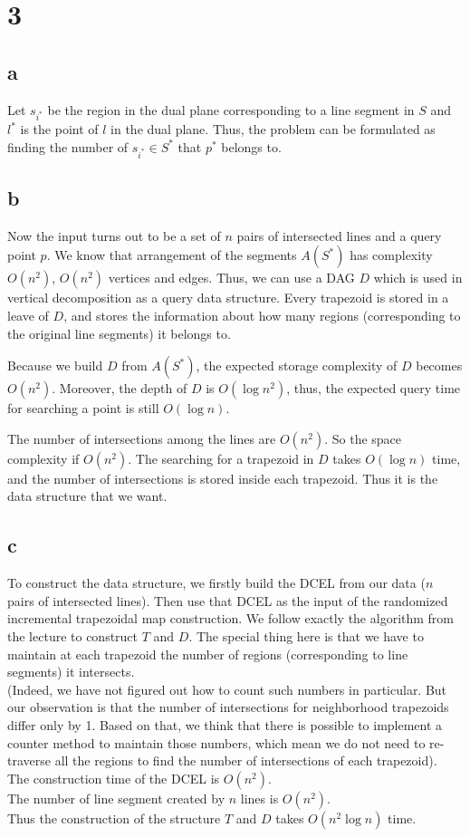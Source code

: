 \section*{3}
\subsection*{a}
Let $s_{i^*}$ be the region in the dual plane corresponding to a line segment in $S$ and $l^*$ is the point
of $l$ in the dual plane.  Thus, the problem can be formulated as finding the number
of $s_{i^*} \in S^*$ that $p^*$ belongs to.

\subsection*{b}
Now the input turns out to be a set of $n$ pairs of intersected lines and a query point $p$.  We know that arrangement of the segments $A(S^*)$ has complexity $O(n^2)$,
$O(n^2)$ vertices and edges. Thus, we can use a DAG $D$ which is used in vertical decomposition as a query data structure.
Every trapezoid is stored in a leave of $D$, and stores the information about how many regions (corresponding to the original line segments) it belongs to.

Because we build $D$ from $A(S^*)$, the expected storage complexity of $D$ becomes $O(n^2)$.
Moreover, the depth of $D$ is $O(\log n^2)$, thus, the expected query time for searching a point is still $O(\log n)$.

The number of intersections among the lines are $O(n^2)$. So the space complexity if $O(n^2)$. The searching for a trapezoid in $D$ takes $O(\log n)$ time, and the number of intersections is stored inside each trapezoid. Thus it is the data structure that we want. \\

\subsection*{c}
To construct the data structure, we firstly build the DCEL from our data ($n$ pairs of intersected lines). Then use that DCEL as the input of the randomized incremental trapezoidal map construction. We follow exactly the algorithm from the lecture to construct $T$ and $D$. The special thing here is that we have to maintain at each trapezoid the number of regions (corresponding to line segments) it intersects. \\

(Indeed, we have not figured out how to count such numbers in particular. But our observation is that the number of intersections for neighborhood trapezoids differ only by 1. Based on that, we think that there is possible to implement a counter method to maintain those numbers, which mean we do not need to re-traverse all the regions to find the number of intersections of each trapezoid). \\

The construction time of the DCEL is $O(n^2)$. \\

The number of line segment created by $n$ lines is $O(n^2)$. \\

Thus the construction of the structure $T$ and $D$ takes $O(n^2 \log n)$ time. \\

